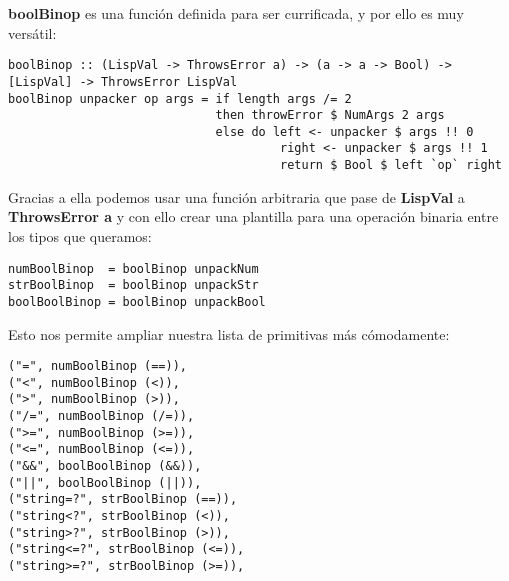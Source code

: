 \textbf{boolBinop} es una funci\'on definida para ser currificada, y por ello es muy vers\'atil:\\

\begin{minipage}{\linewidth}
\begin{tiny}
\begin{lstlisting}[frame=single]
boolBinop :: (LispVal -> ThrowsError a) -> (a -> a -> Bool) -> [LispVal] -> ThrowsError LispVal
boolBinop unpacker op args = if length args /= 2 
                             then throwError $ NumArgs 2 args
                             else do left <- unpacker $ args !! 0
                                      right <- unpacker $ args !! 1
                                      return $ Bool $ left `op` right
\end{lstlisting}
\end{tiny}
\end{minipage}

Gracias a ella podemos usar una funci\'on arbitraria que pase de \textbf{LispVal} a \textbf{ThrowsError a} y con ello crear una plantilla para una operaci\'on binaria entre los tipos que queramos:\\

\begin{minipage}{\linewidth}
\begin{footnotesize}
\begin{lstlisting}[frame=single]
numBoolBinop  = boolBinop unpackNum
strBoolBinop  = boolBinop unpackStr
boolBoolBinop = boolBinop unpackBool
\end{lstlisting}
\end{footnotesize}
\end{minipage}

Esto nos permite ampliar nuestra lista de primitivas m\'as c\'omodamente:\\

\begin{minipage}{\linewidth}
\begin{footnotesize}
\begin{lstlisting}[frame=single]
("=", numBoolBinop (==)),
("<", numBoolBinop (<)),
(">", numBoolBinop (>)),
("/=", numBoolBinop (/=)),
(">=", numBoolBinop (>=)),
("<=", numBoolBinop (<=)),
("&&", boolBoolBinop (&&)),
("||", boolBoolBinop (||)),
("string=?", strBoolBinop (==)),
("string<?", strBoolBinop (<)),
("string>?", strBoolBinop (>)),
("string<=?", strBoolBinop (<=)),
("string>=?", strBoolBinop (>=)),
\end{lstlisting}
\end{footnotesize}
\end{minipage}


